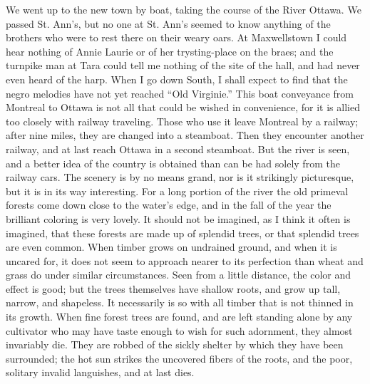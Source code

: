 We went up to the new town by boat, taking the course of the River
Ottawa.  We passed St. Ann's, but no one at St. Ann's seemed to
know anything of the brothers who were to rest there on their weary
oars.  At Maxwellstown I could hear nothing of Annie Laurie or of
her trysting-place on the braes; and the turnpike man at Tara could
tell me nothing of the site of the hall, and had never even heard
of the harp.  When I go down South, I shall expect to find that the
negro melodies have not yet reached ``Old Virginie.''  This boat
conveyance from Montreal to Ottawa is not all that could be wished
in convenience, for it is allied too closely with railway
traveling.  Those who use it leave Montreal by a railway; after
nine miles, they are changed into a steamboat.  Then they encounter
another railway, and at last reach Ottawa in a second steamboat.
But the river is seen, and a better idea of the country is obtained
than can be had solely from the railway cars.  The scenery is by no
means grand, nor is it strikingly picturesque, but it is in its way
interesting.  For a long portion of the river the old primeval
forests come down close to the water's edge, and in the fall of the
year the brilliant coloring is very lovely.  It should not be
imagined, as I think it often is imagined, that these forests are
made up of splendid trees, or that splendid trees are even common.
When timber grows on undrained ground, and when it is uncared for,
it does not seem to approach nearer to its perfection than wheat
and grass do under similar circumstances.  Seen from a little
distance, the color and effect is good; but the trees themselves
have shallow roots, and grow up tall, narrow, and shapeless.  It
necessarily is so with all timber that is not thinned in its
growth.  When fine forest trees are found, and are left standing
alone by any cultivator who may have taste enough to wish for such
adornment, they almost invariably die.  They are robbed of the
sickly shelter by which they have been surrounded; the hot sun
strikes the uncovered fibers of the roots, and the poor, solitary
invalid languishes, and at last dies.

